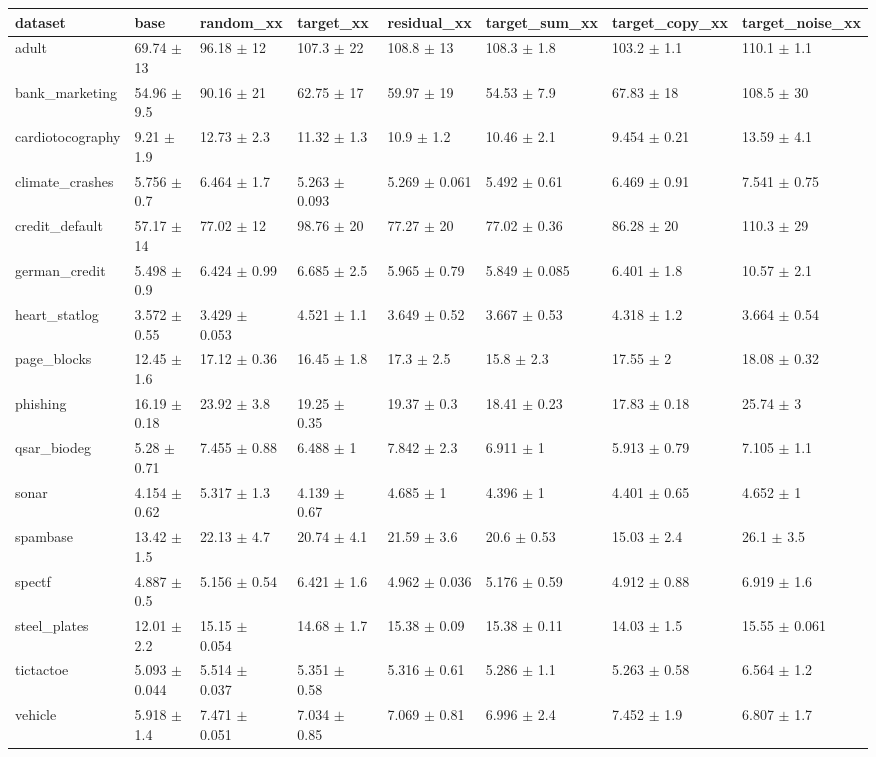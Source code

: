 \begin{tabular}{llllllll}
\toprule
dataset & base & random\_xx & target\_xx & residual\_xx & target\_sum\_xx & target\_copy\_xx & target\_noise\_xx \\
\midrule
adult & 69.74 $\pm$ 13 & 96.18 $\pm$ 12 & 107.3 $\pm$ 22 & 108.8 $\pm$ 13 & 108.3 $\pm$ 1.8 & 103.2 $\pm$ 1.1 & 110.1 $\pm$ 1.1 \\
bank\_marketing & 54.96 $\pm$ 9.5 & 90.16 $\pm$ 21 & 62.75 $\pm$ 17 & 59.97 $\pm$ 19 & 54.53 $\pm$ 7.9 & 67.83 $\pm$ 18 & 108.5 $\pm$ 30 \\
cardiotocography & 9.21 $\pm$ 1.9 & 12.73 $\pm$ 2.3 & 11.32 $\pm$ 1.3 & 10.9 $\pm$ 1.2 & 10.46 $\pm$ 2.1 & 9.454 $\pm$ 0.21 & 13.59 $\pm$ 4.1 \\
climate\_crashes & 5.756 $\pm$ 0.7 & 6.464 $\pm$ 1.7 & 5.263 $\pm$ 0.093 & 5.269 $\pm$ 0.061 & 5.492 $\pm$ 0.61 & 6.469 $\pm$ 0.91 & 7.541 $\pm$ 0.75 \\
credit\_default & 57.17 $\pm$ 14 & 77.02 $\pm$ 12 & 98.76 $\pm$ 20 & 77.27 $\pm$ 20 & 77.02 $\pm$ 0.36 & 86.28 $\pm$ 20 & 110.3 $\pm$ 29 \\
german\_credit & 5.498 $\pm$ 0.9 & 6.424 $\pm$ 0.99 & 6.685 $\pm$ 2.5 & 5.965 $\pm$ 0.79 & 5.849 $\pm$ 0.085 & 6.401 $\pm$ 1.8 & 10.57 $\pm$ 2.1 \\
heart\_statlog & 3.572 $\pm$ 0.55 & 3.429 $\pm$ 0.053 & 4.521 $\pm$ 1.1 & 3.649 $\pm$ 0.52 & 3.667 $\pm$ 0.53 & 4.318 $\pm$ 1.2 & 3.664 $\pm$ 0.54 \\
page\_blocks & 12.45 $\pm$ 1.6 & 17.12 $\pm$ 0.36 & 16.45 $\pm$ 1.8 & 17.3 $\pm$ 2.5 & 15.8 $\pm$ 2.3 & 17.55 $\pm$ 2 & 18.08 $\pm$ 0.32 \\
phishing & 16.19 $\pm$ 0.18 & 23.92 $\pm$ 3.8 & 19.25 $\pm$ 0.35 & 19.37 $\pm$ 0.3 & 18.41 $\pm$ 0.23 & 17.83 $\pm$ 0.18 & 25.74 $\pm$ 3 \\
qsar\_biodeg & 5.28 $\pm$ 0.71 & 7.455 $\pm$ 0.88 & 6.488 $\pm$ 1 & 7.842 $\pm$ 2.3 & 6.911 $\pm$ 1 & 5.913 $\pm$ 0.79 & 7.105 $\pm$ 1.1 \\
sonar & 4.154 $\pm$ 0.62 & 5.317 $\pm$ 1.3 & 4.139 $\pm$ 0.67 & 4.685 $\pm$ 1 & 4.396 $\pm$ 1 & 4.401 $\pm$ 0.65 & 4.652 $\pm$ 1 \\
spambase & 13.42 $\pm$ 1.5 & 22.13 $\pm$ 4.7 & 20.74 $\pm$ 4.1 & 21.59 $\pm$ 3.6 & 20.6 $\pm$ 0.53 & 15.03 $\pm$ 2.4 & 26.1 $\pm$ 3.5 \\
spectf & 4.887 $\pm$ 0.5 & 5.156 $\pm$ 0.54 & 6.421 $\pm$ 1.6 & 4.962 $\pm$ 0.036 & 5.176 $\pm$ 0.59 & 4.912 $\pm$ 0.88 & 6.919 $\pm$ 1.6 \\
steel\_plates & 12.01 $\pm$ 2.2 & 15.15 $\pm$ 0.054 & 14.68 $\pm$ 1.7 & 15.38 $\pm$ 0.09 & 15.38 $\pm$ 0.11 & 14.03 $\pm$ 1.5 & 15.55 $\pm$ 0.061 \\
tictactoe & 5.093 $\pm$ 0.044 & 5.514 $\pm$ 0.037 & 5.351 $\pm$ 0.58 & 5.316 $\pm$ 0.61 & 5.286 $\pm$ 1.1 & 5.263 $\pm$ 0.58 & 6.564 $\pm$ 1.2 \\
vehicle & 5.918 $\pm$ 1.4 & 7.471 $\pm$ 0.051 & 7.034 $\pm$ 0.85 & 7.069 $\pm$ 0.81 & 6.996 $\pm$ 2.4 & 7.452 $\pm$ 1.9 & 6.807 $\pm$ 1.7 \\
\bottomrule
\end{tabular}

